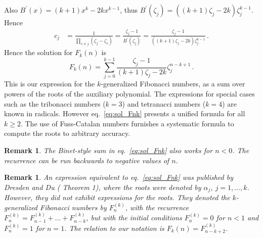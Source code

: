 \documentclass[review]{elsarticle}
\theoremstyle{plain}
\newtheorem{remark}[theorem]{Remark}
\begin{document}
Also $B^\prime(x) = (k+1)x^k-2kx^{k-1}$, thus $B^\prime(\zeta_j) = ((k+1)\zeta_j-2k)\zeta_j^{k-1}$.
Hence
\begin{equation}
\begin{split}
  c_j &= \frac{1}{\prod_{s\ne j}(\zeta_j-\zeta_s)}
  = \frac{\zeta_j-1}{B^\prime(\zeta_j)}
  = \frac{\zeta_j-1}{((k+1)\zeta_j-2k)\zeta_j^{k-1}} \,.
\end{split}
\end{equation}
Hence the solution for $F_k(n)$ is
\begin{equation}
\label{eq:sol_Fnk}
F_k(n) = \sum_{j=0}^{k-1} \frac{\zeta_j-1}{(k+1)\zeta_j-2k} \zeta_j^{n-k+1} \,.
\end{equation}
This is our expression for the $k$-generalized Fibonacci numbers, as a sum over powers of the roots of the auxiliary polynomial.
The expressions for special cases such as the tribonacci numbers ($k=3$) and tetranacci numbers ($k=4$) are known in radicals.
However eq.~\eqref{eq:sol_Fnk} presents a unified formula for all $k\ge2$.
The use of Fuss-Catalan numbers furnishes a systematic formula to compute the roots to arbitrary accuracy.
\begin{remark}
  The Binet-style sum in eq.~\eqref{eq:sol_Fnk} also works for $n<0$.
  The recurrence can be run backwards to negative values of $n$.
\end{remark}
\begin{remark}
An expression equivalent to eq.~\eqref{eq:sol_Fnk} was published by Dresden and Du (\cite{DresdenDu} Theorem 1),
where the roots were denoted by $\alpha_j$, $j=1,\dots,k$.
However, they did not exhibit expressions for the roots.
They denoted the $k$-generalized Fibonacci numbers by $F_n^{(k)}$, with the recurrence
$F_n^{(k)} = F_{n-1}^{(k)} +\dots +F_{n-k}^{(k)}$, but with the initial conditions $F_n^{(k)}=0$ for $n<1$ and $F_n^{(k)}=1$ for $n=1$.
The relation to our notation is $F_k(n) = F_{n-k+2}^{(k)}$.
\end{remark}

\setcounter{equation}{0}
\end{document}
